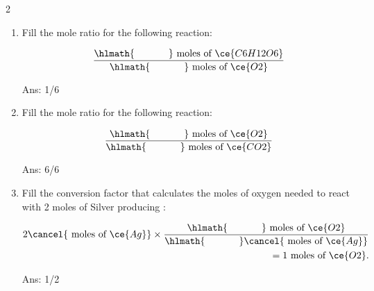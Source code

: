 \documentclass[main.tex]{subfiles}
\begin{document}
\begin{multicols*}{2}
\begin{enumerate}
{\raggedright\textsc{\textbf{Mole-Mole Relationships}}\par}

\item Fill the mole ratio for the following reaction:
\begin{center}\end{center}
\begin{equation*}
\frac{\hlmath{\hspace{35pt}}\text{ moles of }\ce{C6H12O6}}{\hlmath{\hspace{35pt}}\text{ moles of }\ce{O2}} 
\end{equation*}
\begin{flushright}\small Ans: 1/6    \end{flushright}





\item Fill the mole ratio for the following reaction:
\begin{center}\end{center}
\begin{equation*}
\frac{\hlmath{\hspace{35pt}}\text{ moles of }\ce{O2}}{\hlmath{\hspace{35pt}}\text{ moles of }\ce{CO2}} 
\end{equation*}
\begin{flushright}\small Ans: 6/6    \end{flushright}


\item Fill the conversion factor that calculates the moles of oxygen needed to react with 2 moles of Silver producing :
\begin{center}\end{center}
 \begin{equation*}\begin{split}
2\cancel{\text{ moles of }\ce{Ag}} \times \dfrac{\hlmath{\hspace{35pt}}\text{ moles of }\ce{O2}}{\hlmath{\hspace{35pt}}\cancel{\text{ moles of }\ce{Ag}}}\\
=1\text{ moles of }\ce{O2}.
\end{split}\end{equation*}
\begin{flushright}\small Ans: 1/2   \end{flushright}



\end{enumerate}
\end{multicols*}
\end{document}
